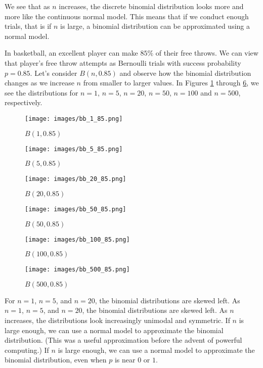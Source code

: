 We see that as \(n\) increases, the discrete binomial distribution looks more and more like the continuous normal model. This means that if we conduct enough trials, that is if \(n\) is large, a binomial distribution can be approximated using a normal model. %

\begin{example}
In basketball, an excellent player can make \(85\%\) of their free throws. We can view that player's free throw attempts as Bernoulli trials with success probability \(p = 0.85\). Let's consider \(B(n,0.85)\) and observe how the binomial distribution changes as we increase \(n\) from smaller to larger values. In Figures \ref{fig:Bn1p85} through \ref{fig:Bn500p85}, we see the distributions for \(n=1\), \(n=5\), \(n=20\), \(n=50\), \(n=100\) and \(n=500\), respectively.
\end{example}

\begin{figure}
	\centering
    \texttt{[image: images/bb\_1\_85.png]}
	\caption{\(B(1,0.85)\)}
	\label{fig:Bn1p85}
\end{figure}


\begin{figure}
	\centering
    \texttt{[image: images/bb\_5\_85.png]}
	\caption{\(B(5,0.85)\)}
	\label{fig:Bn5p85}
\end{figure}

\begin{figure}
	\centering
    \texttt{[image: images/bb\_20\_85.png]}
    \caption{\(B(20,0.85)\)}
	\label{fig:Bn20p85}
\end{figure}

\begin{figure}
	\centering
    \texttt{[image: images/bb\_50\_85.png]}
    \caption{\(B(50,0.85)\)}
	\label{fig:Bn50p85}
\end{figure}

\begin{figure}
	\centering
    \texttt{[image: images/bb\_100\_85.png]}
    \caption{\(B(100,0.85)\)}
	\label{fig:Bn100p85}
\end{figure}

\begin{figure}
	\centering
    \texttt{[image: images/bb\_500\_85.png]}
    \caption{\(B(500,0.85)\)}
	\label{fig:Bn500p85}
\end{figure}

For \(n = 1\), \(n = 5\), and \(n = 20\), the binomial distributions are skewed left. As \(n=1\), \(n=5\), and \(n=20\), the binomial distributions are skewed left. As \(n\) increases, the distributions look increasingly unimodal and symmetric. If \(n\) is large enough, we can use a normal model to approximate the binomial distribution. (This was a useful approximation before the advent of powerful computing.) If \(n\) is large enough, we can use a normal model to approximate the binomial distribution, even when \(p\) is near \(0\) or \(1\).


